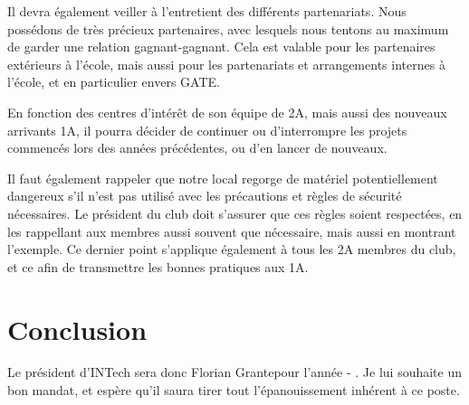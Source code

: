 \documentclass[a4paper,10pt]{article}
\newcommand{\nouveauprez}{Florian Grante}
\newcounter{annee}
\newcounter{anneesuiv}
\begin{document}
Il devra également veiller à l'entretient des différents partenariats. Nous possédons de très précieux partenaires, avec lesquels nous tentons au maximum 
de garder une relation gagnant-gagnant. Cela est valable pour les partenaires extérieurs à l'école, mais aussi pour les partenariats et arrangements internes 
à l'école, et en particulier envers GATE\texttrademark.\newline

En fonction des centres d'intérêt de son équipe de 2A, mais aussi des nouveaux arrivants 1A, il pourra décider de continuer ou d'interrompre les projets commencés 
lors des années précédentes, ou d'en lancer de nouveaux.\newline

Il faut également rappeler que notre local regorge de matériel potentiellement dangereux s'il n'est pas utilisé avec les précautions et règles de sécurité nécessaires.
Le président du club doit s'assurer que ces règles soient respectées, en les rappellant aux membres aussi souvent que nécessaire, mais aussi en montrant l'exemple.
Ce dernier point s'applique également à tous les 2A membres du club, et ce afin de transmettre les bonnes pratiques aux 1A.

\section{Conclusion}

Le président d'INTech sera donc \nouveauprez \space pour l'année \theannee - \theanneesuiv. Je lui souhaite un bon mandat, et espère qu'il saura tirer tout l'épanouissement 
inhérent à ce poste.
\end{document}
